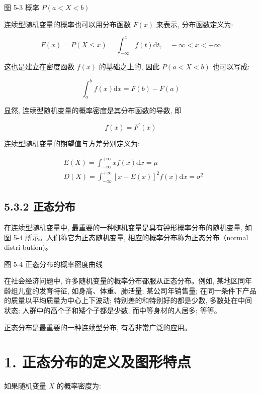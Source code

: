 \documentclass[10pt]{article}
\begin{document}
\begin{CJK*}{UTF8}{bsmi}
图 5-3 概率 $P(a<X<b)$

连续型随机变量的概率也可以用分布函数 $F(x)$ 来表示, 分布函数定义为:


\begin{equation*}
F(x)=P(X \leqslant x)=\int_{-\infty}^{x} f(t) \mathrm{d} t, \quad-\infty<x<+\infty \tag{5.17}
\end{equation*}


这也是建立在密度函数 $f(x)$ 的基础之上的, 因此 $P(a<X<b)$ 也可以写成:


\begin{equation*}
\int_{a}^{b} f(x) \mathrm{d} x=F(b)-F(a) \tag{5.18}
\end{equation*}


显然, 连续型随机变量的概率密度是其分布函数的导数, 即


\begin{equation*}
f(x)=F^{\prime}(x) \tag{5.19}
\end{equation*}


连续型随机变量的期望值与方差分别定义为:


\begin{align*}
& E(X)=\int_{-\infty}^{+\infty} x f(x) \mathrm{d} x=\mu  \tag{5.20}\\
& D(X)=\int_{-\infty}^{+\infty}[x-E(x)]^{2} f(x) \mathrm{d} x=\sigma^{2} \tag{5.21}
\end{align*}


\subsection*{5.3.2 正态分布}
在连续型随机变量中, 最重要的一种随机变量是具有钟形概率分布的随机变量, 如\\
图 5-4 所示。人们称它为正态随机变量, 相应的概率分布称为正态分布（normal distri bution)。

\begin{center}
\end{center}

图 5-4 正态分布的概率密度曲线

在社会经济问题中, 许多随机变量的概率分布都服从正态分布。例如, 某地区同年龄组儿童的发育特征, 如身高、体重、肺活量; 某公司年销售量; 在同一条件下产品的质量以平均质量为中心上下波动; 特别差的和特别好的都是少数, 多数处在中间状态; 人群中的高个子和矮个子都是少数, 而中等身材的人居多; 等等。

正态分布是最重要的一种连续型分布, 有着非常广泛的应用。

\section*{1. 正态分布的定义及图形特点}
如果随机变量 $X$ 的概率密度为:



\end{CJK*}
\end{document}
